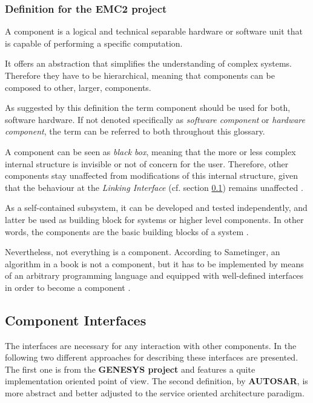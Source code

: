\subsubsection{Definition for the EMC2 project}


\begin{myquote}
A component is a logical and technical separable hardware or software unit that is capable of performing a specific computation.

It offers an abstraction that simplifies the understanding of complex systems. Therefore they have to be hierarchical, meaning that components can be composed to other, larger, components.
\end{myquote}

As suggested by this definition the term component should be used for both, software hardware. If not denoted specifically as \emph{software component} or \emph{hardware component}, the term can be referred to both throughout this glossary.

A component can be seen as \emph{black box}, meaning that the more or less complex internal structure is invisible or not of concern for the user. Therefore, other components stay unaffected from modifications of this internal structure, given that the behaviour at the \emph{Linking Interface} (cf. section \ref{sec:component_interfaces}) remains unaffected \cite[p.38-39]{genesys} \cite{autosar_intro} \cite{sametinger}.

As a self-contained subsystem, it can be developed and tested independently, and latter be used as building block for systems or higher level components. In other words, the components are the basic building blocks of a system \cite{ning}. 

Nevertheless, not everything is a component. According to Sametinger, an algorithm in a book is not a component, but it has to be implemented by means of an arbitrary programming language and equipped with well-defined interfaces in order to become a component \cite[p.2-3]{sametinger}.


\subsection{Component Interfaces}
\label{sec:component_interfaces}


The interfaces are necessary for any interaction with other components. In the following two different approaches for describing these interfaces are presented. The first one is from the \textbf{GENESYS project} and features a quite implementation oriented point of view. The second definition, by \textbf{AUTOSAR}, is more abstract and better adjusted to the service oriented architecture paradigm.



